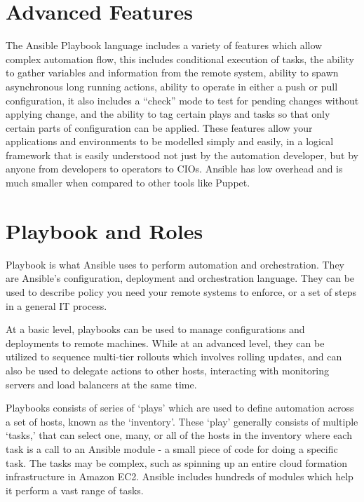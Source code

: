 \documentclass[9pt,twocolumn,twoside]{styles/osajnl}
\begin{document}
\section{Advanced Features}

The Ansible Playbook language includes a variety of features which
allow complex automation flow, this includes conditional execution of
tasks, the ability to gather variables and information from the remote
system, ability to spawn asynchronous long running actions, ability to
operate in either a push or pull configuration, it also includes a
“check” mode to test for pending changes without applying change, and
the ability to tag certain plays and tasks so that only certain parts
of configuration can be applied. \cite{www-ansible3}These features allow your
applications and environments to be modelled simply and easily, in a
logical framework that is easily understood not just by the automation
developer, but by anyone from developers to operators to CIOs. Ansible
has low overhead and is much smaller when compared to other tools like
Puppet. \cite{www-ansible4}

\section{Playbook and Roles}

Playbook is what Ansible uses to perform automation and
orchestration. They are Ansible's configuration, deployment and
orchestration language. They can be used to describe policy you need
your remote systems to enforce, or a set of steps in a general IT
process.\cite{www-ansible5}

At a basic level, playbooks can be used to manage configurations and
deployments to remote machines. While at an advanced level, they can
be utilized to sequence multi-tier rollouts which involves rolling
updates, and can also be used to delegate actions to other hosts,
interacting with monitoring servers and load balancers at the same time.

Playbooks consists of series of ‘plays’ which are used to define
automation across a set of hosts, known as the ‘inventory’. These
‘play’ generally consists of multiple ‘tasks,’ that can select one,
many, or all of the hosts in the inventory where each task is a call
to an Ansible module - a small piece of code for doing a specific
task. The tasks may be complex, such as spinning up an entire cloud
formation infrastructure in Amazon EC2. Ansible includes hundreds of
modules which help it perform a vast range of
tasks.\cite{www-ansible}
\end{document}
